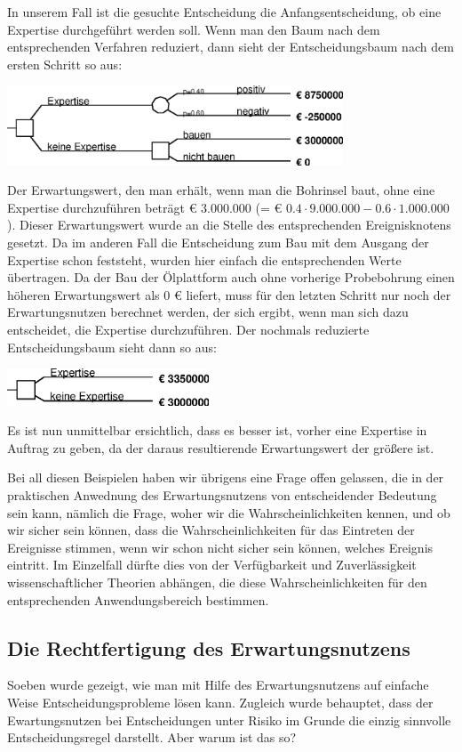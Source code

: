 In unserem Fall ist die gesuchte Entscheidung die Anfangsentscheidung, ob eine
Expertise durchgeführt werden soll. Wenn man den Baum nach dem entsprechenden
Verfahren reduziert, dann sieht der Entscheidungsbaum nach dem ersten Schritt
so aus:
\begin{center}
\includegraphics[width=10cm]{Grafiken/Beispiel6_3B.eps}
\end{center}
Der Erwartungswert, den man erhält, wenn man die Bohrinsel baut, ohne eine
Expertise durchzuführen beträgt € 3.000.000 (= € $0.4 \cdot 9.000.000 - 0.6
\cdot 1.000.000$). Dieser Erwartungswert wurde an die Stelle des entsprechenden
Ereignisknotens gesetzt. Da im anderen Fall die Entscheidung zum Bau
mit dem Ausgang der Expertise schon feststeht, wurden hier einfach die
entsprechenden Werte übertragen. Da der Bau der Ölplattform auch ohne vorherige
Probebohrung einen höheren Erwartungswert als 0 € liefert, muss für den letzten
Schritt nur noch der Erwartungsnutzen berechnet werden, der sich ergibt, wenn
man sich dazu entscheidet, die Expertise durchzuführen. Der nochmals reduzierte
Entscheidungsbaum sieht dann so aus:
\begin{center}
\includegraphics[width=6cm]{Grafiken/Beispiel6_3C.eps}
\end{center}
Es ist nun unmittelbar ersichtlich, dass es besser ist, vorher eine Expertise
in Auftrag zu geben, da der daraus resultierende Erwartungswert der größere
ist. 

Bei all diesen Beispielen haben wir übrigens eine Frage offen gelassen, die in
der praktischen Anwednung des Erwartungsnutzens von entscheidender Bedeutung
sein kann, nämlich die Frage, woher wir die Wahrscheinlichkeiten kennen, und ob
wir sicher sein können, dass die Wahrscheinlichkeiten für das Eintreten der
Ereignisse stimmen, wenn wir schon nicht sicher sein können, welches Ereignis
eintritt. Im Einzelfall dürfte dies von der Verfügbarkeit und Zuverlässigkeit
wissenschaftlicher Theorien abhängen, die diese Wahrscheinlichkeiten für den
entsprechenden Anwendungsbereich bestimmen.

\subsection{Die Rechtfertigung des Erwartungsnutzens}
\label{RechtfertigungErwartungsnutzen}
Soeben wurde gezeigt, wie man mit Hilfe des Erwartungsnutzens auf einfache
Weise Entscheidungsprobleme lösen kann. Zugleich wurde behauptet, dass der
Ewartungsnutzen bei Entscheidungen unter Risiko im Grunde die einzig sinnvolle
Entscheidungsregel darstellt. Aber warum ist das so? 

